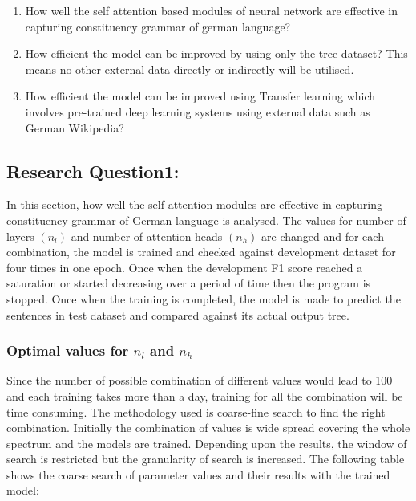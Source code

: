 \documentclass[a4paper, 11pt]{article}
\begin{document}
\begin{enumerate}
\item How well the self attention based modules of neural network are effective in capturing constituency grammar of german language? 
\item How efficient the model can be improved by using only the tree dataset? This means no other external data directly or indirectly will be utilised. 
\item How efficient the model can be improved using Transfer learning which involves pre-trained deep learning systems using external data such as German Wikipedia?
\end{enumerate}


\subsection{Research Question1:}

In this section, how well the self attention modules are effective in capturing constituency grammar of German language is analysed. The values for number of layers $(n_l)$ and number of attention heads $(n_h)$ are changed and for each combination, the model is trained and checked against development dataset for four times in one epoch. Once when the development F1 score reached a saturation or started decreasing over a period of time then the program is stopped. Once when the training is completed, the model is made to predict the sentences in test dataset and compared against its actual output tree. 

\subsubsection{Optimal values for $n_l$ and $n_h$}

Since the number of possible combination of different values would lead to 100 and each training takes more than a day, training for all the combination will be time consuming. The methodology used is coarse-fine search to find the right combination. Initially the combination of values is wide spread covering the whole spectrum and the models are trained. Depending upon the results, the window of search is restricted but the granularity of search is increased. The following table shows the coarse search of parameter values and their results with the trained model:
\end{document}
